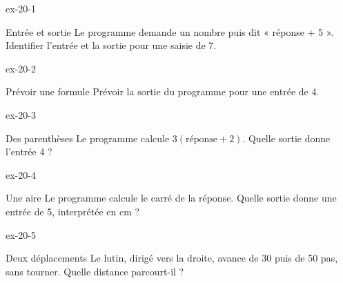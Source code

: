 \clearpage{}
\begin{blocLivre}{ex-20-1}\begin{exercice}[1]{Entrée et sortie}
Le programme demande un nombre puis dit « réponse + 5 ». Identifier l’entrée et la sortie pour une saisie de 7.
\label{fig-ex-20-1}
\end{exercice}\end{blocLivre}
\begin{blocLivre}{ex-20-2}\begin{exercice}[1]{Prévoir une formule}
Prévoir la sortie du programme pour une entrée de 4.
\label{fig-ex-20-2}
\end{exercice}\end{blocLivre}
\begin{blocLivre}{ex-20-3}\begin{exercice}[1]{Des parenthèses}
Le programme calcule $3(\text{réponse}+2)$. Quelle sortie donne l’entrée 4 ?
\label{fig-ex-20-3}
\end{exercice}\end{blocLivre}
\begin{blocLivre}{ex-20-4}\begin{exercice}[1]{Une aire}
Le programme calcule le carré de la réponse. Quelle sortie donne une entrée de 5, interprétée en cm ?
\label{fig-ex-20-4}
\end{exercice}\end{blocLivre}
\begin{blocLivre}{ex-20-5}\begin{exercice}[1]{Deux déplacements}
Le lutin, dirigé vers la droite, avance de 30 puis de 50 pas, sans tourner. Quelle distance parcourt-il ?
\label{fig-ex-20-5}
\end{exercice}\end{blocLivre}

